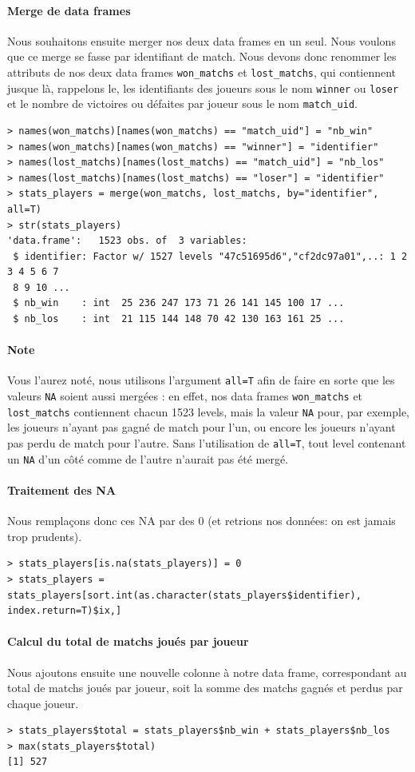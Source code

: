 \documentclass{report}
\begin{document}
\begin{appendices}
\paragraph{Merge de data frames}
Nous souhaitons ensuite merger nos deux data frames en un seul. Nous voulons que
ce merge se fasse par identifiant de match. Nous devons donc renommer les
attributs de nos deux data frames \verb+won_matchs+ et \verb+lost_matchs+, qui
contiennent jusque là, rappelons le, les identifiants des joueurs sous le nom
\verb+winner+ ou \verb+loser+ et le nombre de victoires ou défaites par joueur
sous le nom \verb+match_uid+.
\begin{lstlisting}
> names(won_matchs)[names(won_matchs) == "match_uid"] = "nb_win"
> names(won_matchs)[names(won_matchs) == "winner"] = "identifier"
> names(lost_matchs)[names(lost_matchs) == "match_uid"] = "nb_los"
> names(lost_matchs)[names(lost_matchs) == "loser"] = "identifier"
> stats_players = merge(won_matchs, lost_matchs, by="identifier", all=T)
> str(stats_players)
'data.frame':   1523 obs. of  3 variables:
 $ identifier: Factor w/ 1527 levels "47c51695d6","cf2dc97a01",..: 1 2 3 4 5 6 7
 8 9 10 ...
 $ nb_win    : int  25 236 247 173 71 26 141 145 100 17 ...
 $ nb_los    : int  21 115 144 148 70 42 130 163 161 25 ...
\end{lstlisting}
\paragraph{Note}
Vous l'aurez noté, nous utilisons l'argument \verb+all=T+ afin de faire en
sorte que les valeurs \verb+NA+ soient aussi mergées : en effet, nos data frames
\verb+won_matchs+ et \verb+lost_matchs+ contiennent chacun 1523 levels, mais la
valeur \verb+NA+ pour, par exemple, les joueurs n'ayant pas gagné de match pour
l'un, ou encore les joueurs n'ayant pas perdu de match pour l'autre. Sans
l'utilisation de \verb+all=T+, tout level contenant un \verb+NA+ d'un côté comme
de l'autre n'aurait pas été mergé.
\paragraph{Traitement des NA}
Nous remplaçons donc ces NA par des 0 (et retrions nos données: on est jamais
trop prudents).
\begin{lstlisting}
> stats_players[is.na(stats_players)] = 0
> stats_players = stats_players[sort.int(as.character(stats_players$identifier),
index.return=T)$ix,]
\end{lstlisting}
\paragraph{Calcul du total de matchs joués par joueur}
Nous ajoutons ensuite une nouvelle colonne à notre data frame, correspondant au
total de matchs joués par joueur, soit la somme des matchs gagnés et perdus par
chaque joueur.
\begin{lstlisting}
> stats_players$total = stats_players$nb_win + stats_players$nb_los
> max(stats_players$total)
[1] 527
\end{lstlisting}

\end{appendices}
\end{document}
